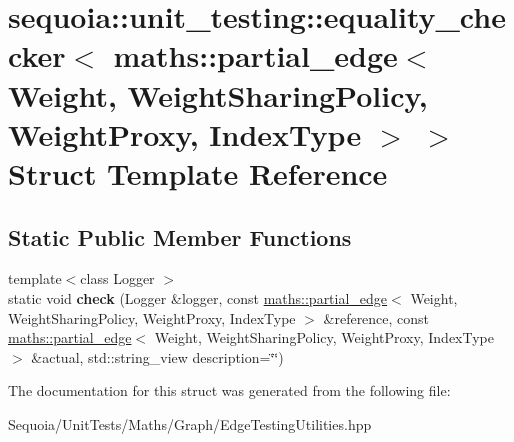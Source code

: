 \hypertarget{structsequoia_1_1unit__testing_1_1equality__checker_3_01maths_1_1partial__edge_3_01_weight_00_011c0c872352ccf030d7bcdf38b36d5b17}{}\section{sequoia\+::unit\+\_\+testing\+::equality\+\_\+checker$<$ maths\+::partial\+\_\+edge$<$ Weight, Weight\+Sharing\+Policy, Weight\+Proxy, Index\+Type $>$ $>$ Struct Template Reference}
\label{structsequoia_1_1unit__testing_1_1equality__checker_3_01maths_1_1partial__edge_3_01_weight_00_011c0c872352ccf030d7bcdf38b36d5b17}
\subsection*{Static Public Member Functions}
\begin{DoxyCompactItemize}
\item 
\mbox{\label{structsequoia_1_1unit__testing_1_1equality__checker_3_01maths_1_1partial__edge_3_01_weight_00_011c0c872352ccf030d7bcdf38b36d5b17_abe87033f297ff193dc82c3b8275ce4da}} 
{\footnotesize template$<$class Logger $>$ }\\static void {\bfseries check} (Logger \&logger, const \mbox{\hyperlink{classsequoia_1_1maths_1_1partial__edge}{maths\+::partial\+\_\+edge}}$<$ Weight, Weight\+Sharing\+Policy, Weight\+Proxy, Index\+Type $>$ \&reference, const \mbox{\hyperlink{classsequoia_1_1maths_1_1partial__edge}{maths\+::partial\+\_\+edge}}$<$ Weight, Weight\+Sharing\+Policy, Weight\+Proxy, Index\+Type $>$ \&actual, std\+::string\+\_\+view description=\char`\"{}\char`\"{})
\end{DoxyCompactItemize}


The documentation for this struct was generated from the following file\+:\begin{DoxyCompactItemize}
\item 
Sequoia/\+Unit\+Tests/\+Maths/\+Graph/Edge\+Testing\+Utilities.\+hpp\end{DoxyCompactItemize}

